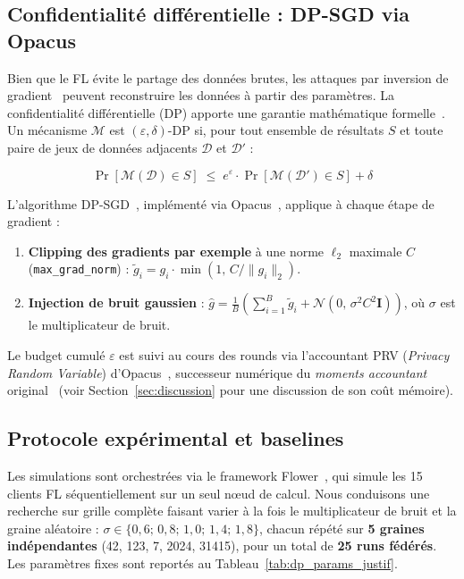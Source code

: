 \documentclass{article}
\begin{document}
\subsection{Confidentialité différentielle : DP-SGD via Opacus}
\label{subsec:dp}

Bien que le FL évite le partage des données brutes, les attaques par inversion de
gradient~\cite{geiping2020inverting} peuvent reconstruire les données à partir des
paramètres. La confidentialité différentielle (DP) apporte une garantie mathématique
formelle~\cite{dwork2014foundations}. Un mécanisme $\mathcal{M}$ est $(\varepsilon,
\delta)$-DP si, pour tout ensemble de résultats $S$ et toute paire de jeux de données
adjacents $\mathcal{D}$ et $\mathcal{D}'$ :

\begin{equation}
  \Pr[\mathcal{M}(\mathcal{D}) \in S] \;\leq\; e^\varepsilon \cdot
  \Pr[\mathcal{M}(\mathcal{D}') \in S] + \delta
  \label{eq:dp_form}
\end{equation}

L'algorithme DP-SGD~\cite{abadi2016deep}, implémenté via Opacus~\cite{opacus},
applique à chaque étape de gradient :

\begin{enumerate}
  \item \textbf{Clipping des gradients par exemple} à une norme $\ell_2$ maximale $C$
  (\texttt{max\_grad\_norm}) :
  $\tilde{g}_i = g_i \cdot \min\!\left(1,\, C / \|g_i\|_2\right)$.
  \item \textbf{Injection de bruit gaussien} :
  $\hat{g} = \frac{1}{B}\!\left(\sum_{i=1}^B \tilde{g}_i +
  \mathcal{N}\!\left(0,\, \sigma^2 C^2 \mathbf{I}\right)\right)$,
  où $\sigma$ est le multiplicateur de bruit.
\end{enumerate}

Le budget cumulé $\varepsilon$ est suivi au cours des rounds via l'accountant PRV
(\textit{Privacy Random Variable}) d'Opacus~\cite{opacus}, successeur numérique du
\textit{moments accountant} original~\cite{abadi2016deep} (voir
Section~\ref{sec:discussion} pour une discussion de son coût mémoire).

\subsection{Protocole expérimental et baselines}
\label{subsec:protocol}

Les simulations sont orchestrées via le framework Flower~\cite{beutel2020flower}, qui
simule les 15 clients FL séquentiellement sur un seul nœud de calcul. Nous conduisons
une recherche sur grille complète faisant varier à la fois le multiplicateur de bruit
et la graine aléatoire : $\sigma \in \{0{,}6;\, 0{,}8;\, 1{,}0;\, 1{,}4;\, 1{,}8\}$,
chacun répété sur \textbf{5 graines indépendantes} (42, 123, 7, 2024, 31415), pour un
total de \textbf{25 runs fédérés}. Les paramètres fixes sont reportés au
Tableau~\ref{tab:dp_params_justif}.
\end{document}

